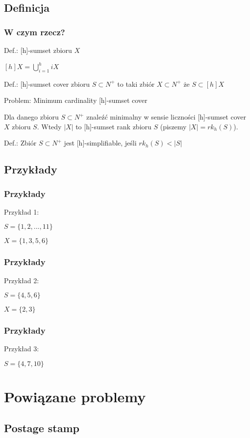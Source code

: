 \documentclass{beamer}
\begin{document}
	\subsection{Definicja}
		\begin{frame} \frametitle{W czym rzecz?}
			Def.: [h]-sumset zbioru $ X $
			
			$ [h]X = \bigcup_{i=1}^{h} iX $
			
			Def.: [h]-sumset cover zbioru $ S \subset N^{+} $ to taki zbiór $ X \subset N^{+} $ że $ S \subset [h]X $			
			
			Problem: Minimum cardinality [h]-sumset cover
			
			Dla danego zbioru $ S \subset N^{+} $ znaleźć minimalny w sensie liczności [h]-sumset cover $ X $ zbioru $ S $. Wtedy $ |X| $ to [h]-sumset rank zbioru $ S $ (piszemy $ |X| = rk_{h}(S) $).
			
			Def.: Zbiór $ S \subset N^{+} $ jest [h]-simplifiable, jeśli $ rk_{h}(S) < |S| $
		\end{frame}
		
	\subsection{Przykłady}
		\begin{frame} \frametitle{Przykłady}
			Przykład 1:
			
			$ S = \lbrace 1,2,...,11 \rbrace $
			
			$ X = \lbrace 1,3,5,6 \rbrace $
		\end{frame}
			
		\begin{frame} \frametitle{Przykłady}
			Przykład 2:
			
			$ S = \lbrace 4,5,6 \rbrace $
			
			$ X = \lbrace 2,3 \rbrace $
		\end{frame}
		
		\begin{frame} \frametitle{Przykłady}		
			Przykład 3:
			
			$ S =  \lbrace 4,7,10 \rbrace $						
		\end{frame}
		
\section{Powiązane problemy}
	\subsection{Postage stamp}
		\begin{frame}
		\end{frame}
		
\end{document}
